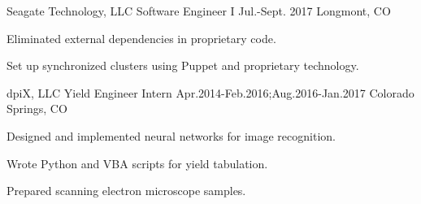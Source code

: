 \begin{cventries}

  \cventry
  	{Seagate Technology, LLC} %
    {Software Engineer I} %
    {Jul.-Sept. 2017} %
    {Longmont, CO} %
    {
      \begin{cvitems} %
        \item {Eliminated external dependencies in proprietary code.}
        \item {Set up synchronized clusters using Puppet and proprietary technology.}
      \end{cvitems}
    }
  \cventry
  	{dpiX, LLC} %
    {Yield Engineer Intern} %
    {Apr.2014-Feb.2016;Aug.2016-Jan.2017} %
    {Colorado Springs, CO} %
    {
      \begin{cvitems} %
        \item {Designed and implemented neural networks for image recognition.}
        \item {Wrote Python and VBA scripts for yield tabulation.}
        \item {Prepared scanning electron microscope samples.}
      \end{cvitems}
}
\end{cventries}
